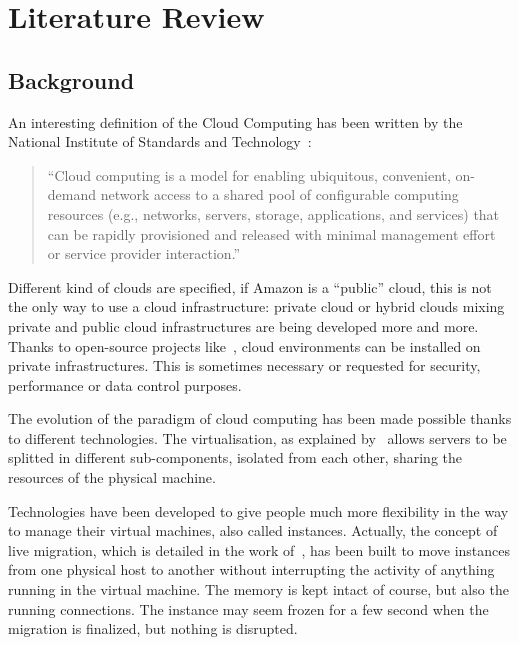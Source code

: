 \chapter{Literature Review}
\label{litreview}

\section{Background}

An interesting definition of the Cloud Computing has
been written by the National Institute of Standards and Technology~\citep*{nistcloudcomputing}:

\begin{quote}
	“Cloud computing is a model for enabling ubiquitous, convenient, on-demand
	network access to a shared pool of configurable computing resources (e.g.,
	networks, servers, storage, applications, and services) that can be rapidly
	provisioned and released with minimal management effort or service provider
	interaction.”
\end{quote}

Different kind of clouds are specified, if Amazon is a “public” cloud, this is
not the only way to use a cloud infrastructure: private cloud or hybrid clouds
mixing private and public cloud infrastructures are being developed more and
more. Thanks to open-source projects like~\cite{websiteOpenstack},
cloud environments can be installed on private infrastructures. This is
sometimes necessary or requested for security, performance or data control
purposes.

The evolution of the paradigm of cloud computing has been made possible thanks
to different technologies. The virtualisation, as explained
by~\cite*{virtualisation} allows servers to be splitted in different
sub-components, isolated from each other, sharing the resources of the physical
machine. 

Technologies have been developed to give people much more flexibility in the
way to manage their virtual machines, also called instances. Actually, the
concept of live migration, which is detailed in the work
of~\cite*{livemigration}, has been built to move instances from one physical
host to another without interrupting the activity of anything running in the
virtual machine. The memory is kept intact of course, but also the running
connections.  The instance may seem frozen for a few second when the migration
is finalized, but nothing is disrupted.

